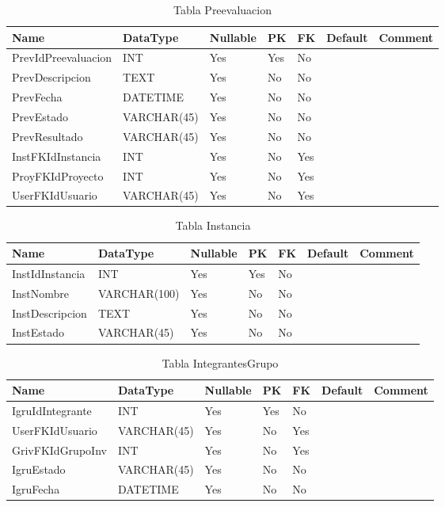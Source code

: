 \begin{table}
	\caption{Tabla Preevaluacion}
	\label{labelTablePreevaluacion}
	\begin{tabular}{ |l|l|l|l|l|l|l| }
		\hline
		Name & DataType & Nullable & PK & FK & Default & Comment \\ \hline
		PrevIdPreevaluacion & INT & Yes & Yes & No &  & \\ \hline 
		PrevDescripcion & TEXT & Yes & No & No &  & \\ \hline 
		PrevFecha & DATETIME & Yes & No & No &  & \\ \hline 
		PrevEstado & VARCHAR(45) & Yes & No & No &  & \\ \hline 
		PrevResultado & VARCHAR(45) & Yes & No & No &  & \\ \hline 
		InstFKIdInstancia & INT & Yes & No & Yes &  & \\ \hline 
		ProyFKIdProyecto & INT & Yes & No & Yes &  & \\ \hline 
		UserFKIdUsuario & VARCHAR(45) & Yes & No & Yes &  & \\ \hline 
		
	\end{tabular}
\end{table}


\begin{table}
	\caption{Tabla Instancia}
	\label{labelTableInstancia}
	\begin{tabular}{ |l|l|l|l|l|l|l| }
		\hline
		Name & DataType & Nullable & PK & FK & Default & Comment \\ \hline
		InstIdInstancia & INT & Yes & Yes & No &  & \\ \hline 
		InstNombre & VARCHAR(100) & Yes & No & No &  & \\ \hline 
		InstDescripcion & TEXT & Yes & No & No &  & \\ \hline 
		InstEstado & VARCHAR(45) & Yes & No & No &  & \\ \hline 
		
	\end{tabular}
\end{table}


\begin{table}
	\caption{Tabla IntegrantesGrupo}
	\label{labelTableIntegrantesGrupo}
	\begin{tabular}{ |l|l|l|l|l|l|l| }
		\hline
		Name & DataType & Nullable & PK & FK & Default & Comment \\ \hline
		IgruIdIntegrante & INT & Yes & Yes & No &  & \\ \hline 
		UserFKIdUsuario & VARCHAR(45) & Yes & No & Yes &  & \\ \hline 
		GrivFKIdGrupoInv & INT & Yes & No & Yes &  & \\ \hline 
		IgruEstado & VARCHAR(45) & Yes & No & No &  & \\ \hline 
		IgruFecha & DATETIME & Yes & No & No &  & \\ \hline 
		
	\end{tabular}
\end{table}


